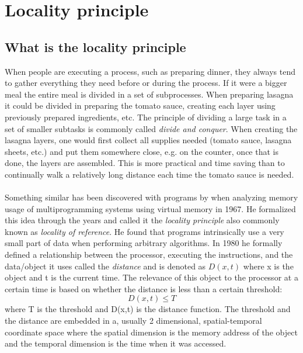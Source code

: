 \documentclass[pdftex,a4paper,12pt,twoside]{report}
\begin{document}
\section{Locality principle}
\subsection{What is the locality principle}
When people are executing a process, such as preparing dinner, they always tend to gather everything they need before or during the process. If it were a bigger meal the entire meal is divided in a set of subprocesses. When preparing lasagna it could be divided in preparing the tomato sauce, creating each layer using previously prepared ingredients, etc. The principle of dividing a large task in a set of smaller subtasks is commonly called \emph{divide and conquer}.
When creating the lasagna layers, one would first collect all supplies needed (tomato sauce, lasagna sheets, etc.) and put them somewhere close, e.g. on the counter, once that is done, the layers are assembled. This is more practical and time saving than to continually walk a relatively long distance each time the tomato sauce is needed.
\\\\
Something similar has been discovered with programs by \cite{locality_principle} when analyzing memory usage of multiprogramming systems using virtual memory in 1967.
He formalized this idea through the years and called it the \emph{locality principle} also commonly known as \emph{locality of reference}. He found that programs intrinsically use a very small part of data when performing arbitrary algorithms. In 1980 he formally defined a relationship between the processor, executing the instructions, and the data/object it uses called the \emph{distance} and is denoted as $D(x,t)$ where x is the object and t is the current time. The relevance of this object to the processor at a certain time is based on whether the distance is less than a certain threshold:
\[
	D(x,t) \leq T
\]
where T is the threshold and D(x,t) is the distance function. The threshold and the distance are embedded in a, usually 2 dimensional, spatial-temporal coordinate space where the spatial dimension is the memory address of the object and the temporal dimension is the time when it was accessed.
\end{document}
